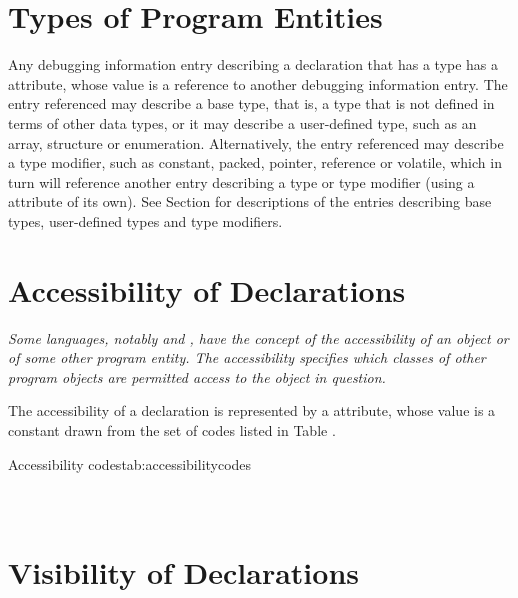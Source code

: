\section{Types of Program Entities}
\label{chap:typesofprogramentities}
\hypertarget{chap:DWATtypetypeofdeclaration}{}
Any debugging information entry describing a declaration that
has a type has 
a \DWATtype{} attribute, whose value is a
reference to another debugging information entry. The entry
referenced may describe a base type, that is, a type that is
not defined in terms of other data types, or it may describe a
user-defined type, such as an array, structure or enumeration.
Alternatively, the entry referenced may describe a type
modifier, such as constant, packed, pointer, reference or
volatile, which in turn will reference another entry describing
a type or type modifier (using 
a \DWATtype{} attribute of its
own). See 
Section   
for descriptions of the entries describing
base types, user-defined types and type modifiers.


\section{Accessibility of Declarations}
\label{chap:accessibilityofdeclarations}
\textit{Some languages, notably  and 
, have the concept of
the accessibility of an object or of some other program
entity. The accessibility specifies which classes of other
program objects are permitted access to the object in question.}

The accessibility of a declaration is 
\hypertarget{chap:DWATaccessibilitycandadadeclarations}{}
represented by a 
\DWATaccessibility{} 
attribute, whose
value is a constant drawn from the set of codes listed in Table 
.

\begin{simplenametable}[1.9in]{Accessibility codes}{tab:accessibilitycodes}
\DWACCESSpublicTARG{}          \\
\DWACCESSprivateTARG{}        \\
\DWACCESSprotectedTARG{}    \\
\end{simplenametable}

\section{Visibility of Declarations}
\label{chap:visibilityofdeclarations}

